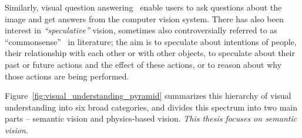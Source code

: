 Similarly, visual question answering~\citep{antol2015vqa} enable users to ask questions about the image and get answers from the computer vision system.
There has also been interest in \textit{``speculative''} vision, sometimes also controversially referred to as ``commonsense''~\citep{zellers2019recognition,park2020visualcomet} in literature; the aim is to speculate about intentions of people, their relationship with each other or with other objects, to speculate about their past or future actions and the effect of these actions, or to reason about why those actions are being performed.

Figure~\ref{fig:visual_understanding_pyramid} summarizes this hierarchy of visual understanding into six broad categories, and divides this spectrum into two main parts -- semantic vision and physics-based vision.
\textit{This thesis focuses on semantic vision.}


